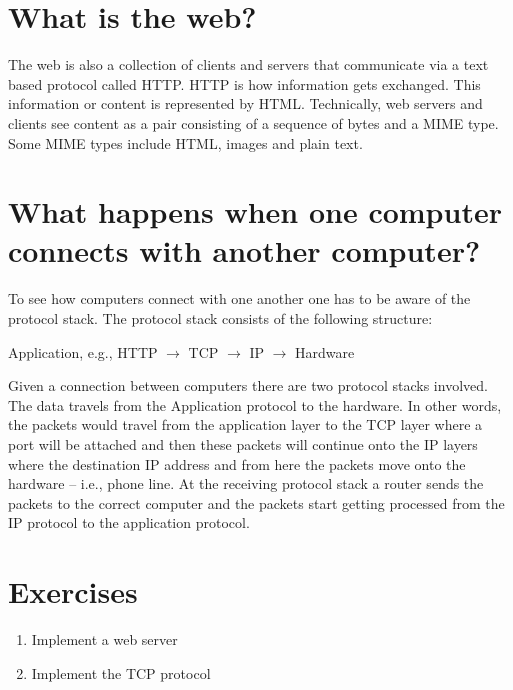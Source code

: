 \documentclass{amsbook}
\begin{document}
\section{What is the web?}
The web is also a collection of clients and servers that communicate via a text based protocol called HTTP. HTTP is how information gets exchanged. This information or content is represented by HTML. Technically, web servers and clients see content as a pair consisting of a sequence of bytes and a MIME type. Some MIME types include HTML, images and plain text.

\section{What happens when one computer connects with another computer?}
To see how computers connect with one another one has to be aware of the protocol stack. The protocol stack consists of the following structure:

Application, e.g., HTTP $\rightarrow$ TCP $\rightarrow$ IP $\rightarrow$ Hardware

Given a connection between computers there are two protocol stacks involved. The data travels from the Application protocol to the hardware. In other words, the packets would travel from the application layer to the TCP layer where a port will be attached and then these packets will continue onto the IP layers where the destination IP address and from here the packets move onto the hardware -- i.e., phone line. At the receiving protocol stack a router sends the packets to the correct computer and the packets start getting processed from the IP protocol to the application protocol.

\section{Exercises}
\begin{enumerate}
    \item Implement a web server
    \item Implement the TCP protocol
\end{enumerate}
\end{document}
